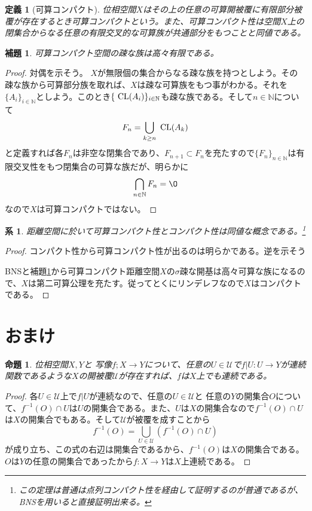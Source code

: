 \documentclass[leqno]{jsarticle}
\newtheorem{prop}[thm]{命題}
\newtheorem{cor}[thm]{系}
\newtheorem{lem}[thm]{補題}
\newtheorem{df}[thm]{定義}
\newcommand{\nn}{\mathbb{N}}
\newcommand{\cl}{\text{  {\rm CL}} }
\begin{document}
\begin{df}[可算コンパクト]
位相空間$X$はその上の任意の可算開被覆に有限部分被覆が存在するとき可算コンパクトという。また、可算コンパクト性は空間$X$上の閉集合からなる任意の有限交叉的な可算族が共通部分をもつことと同値である。
\end{df}


\begin{lem}\label{ccpt}
可算コンパクト空間の疎な族は高々有限である。
\end{lem}
\begin{proof}対偶を示そう。
$X$が無限個の集合からなる疎な族を持つとしよう。その疎な族から可算部分族を取れば、$X$は疎な可算族をもつ事がわかる。それを$\{A_i\}_{i\in \nn}$としよう。このとき$\{\cl(A_i)\}_{i\in \nn}$も疎な族である。そして$n\in \nn$について
\[
F_n=\bigcup_{k\ge n}\cl(A_k)
\]
と定義すれば各$F_n$は非空な閉集合であり、$F_{n+1}\subset F_n$を充たすので$\{F_n\}_{n\in \nn}$は有限交叉性をもつ閉集合の可算な族だが、明らかに
\[
\bigcap_{n\in \nn}F_n=\O
\]
なので$X$は可算コンパクトではない。
\end{proof}

\begin{cor}
距離空間に於いて可算コンパクト性とコンパクト性は同値な概念である。\footnote{この定理は普通は点列コンパクト性を経由して証明するのが普通であるが、BNSを用いると直接証明出来る。}
\end{cor}
\begin{proof}コンパクト性から可算コンパクト性が出るのは明らかである。逆を示そう\par
BNSと補題\ref{ccpt}から可算コンパクト距離空間$X$の$\sigma$疎な開基は高々可算な族になるので、$X$は第二可算公理を充たす。従ってとくにリンデレフなので$X$はコンパクトである。
\end{proof}





\section{おまけ}
\begin{prop}位相空間$X,Y$と
写像$f;X\to Y$について、任意の$U\in \mathcal{U}$で$f|U:U\to Y$が連続関数であるような$X$の開被覆$\mathcal{U}$が存在すれば、$f$は$X$上でも連続である。
\end{prop}
\begin{proof}
各$U\in \mathcal{U}$上で$f|U$が連続なので、任意の$U\in \mathcal{U}$と
任意の$Y$の開集合$O$について、$f^{-1}(O)\cap U$は$U$の開集合である。また、$U$は$X$の開集合なので$f^{-1}(O)\cap U$は$X$の開集合でもある。そして$\mathcal{U}$が被覆を成すことから
\[
f^{-1}(O)=\bigcup_{U\in \mathcal{U}}(f^{-1}(O)\cap U)
\]
が成り立ち、この式の右辺は開集合であるから、$f^{-1}(O)$は$X$の開集合である。$O$は$Y$の任意の開集合であったから$f:X\to Y$は$X$上連続である。
\end{proof}
\end{document}
